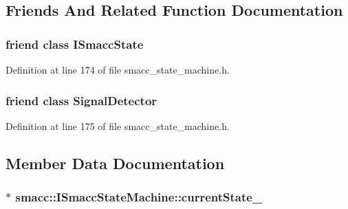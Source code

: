 \subsection{Friends And Related Function Documentation}
\subsubsection[{\texorpdfstring{I\+Smacc\+State}{ISmaccState}}]{\setlength{\rightskip}{0pt plus 5cm}friend class {\bf I\+Smacc\+State}\hspace{0.3cm}{\ttfamily [friend]}}\hypertarget{classsmacc_1_1ISmaccStateMachine_ab907e4cdbf326246355f56640780162e}{}\label{classsmacc_1_1ISmaccStateMachine_ab907e4cdbf326246355f56640780162e}


Definition at line 174 of file smacc\+\_\+state\+\_\+machine.\+h.

\subsubsection[{\texorpdfstring{Signal\+Detector}{SignalDetector}}]{\setlength{\rightskip}{0pt plus 5cm}friend class {\bf Signal\+Detector}\hspace{0.3cm}{\ttfamily [friend]}}\hypertarget{classsmacc_1_1ISmaccStateMachine_a9fb9044f83e768849d1b42d9d0d5508e}{}\label{classsmacc_1_1ISmaccStateMachine_a9fb9044f83e768849d1b42d9d0d5508e}


Definition at line 175 of file smacc\+\_\+state\+\_\+machine.\+h.



\subsection{Member Data Documentation}
\subsubsection[{\texorpdfstring{current\+State\+\_\+}{currentState_}}]{$\ast$ smacc\+::\+I\+Smacc\+State\+Machine\+::current\+State\+\_\+\hspace{0.3cm}{\ttfamily [protected]}}\hypertarget{classsmacc_1_1ISmaccStateMachine_a9c6e7745205bcce80a301f2fbe8f7e99}{}\label{classsmacc_1_1ISmaccStateMachine_a9c6e7745205bcce80a301f2fbe8f7e99}


